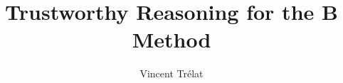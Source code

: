 \documentclass[fontsize=9pt]{scrbook}
\begin{document}
\newcommand{\ThesisTitle}{Trustworthy Reasoning for the B Method}
\newcommand{\ThesisAuthor}{Vincent Tr\'{e}lat}
\newcommand{\ThesisDate}{10 novembre 2026}

\title{\ThesisTitle}
\author{\ThesisAuthor}


\frontmatter

\ifThesisArtCover
  
\fi
\ifThesisOfficialCover
  
\fi
% 
\cleardoublepage

\ifThesisFullBody

  
  
  
  

  \begingroup
  \hypersetup{linkcolor=black}
  \tableofcontents
  \endgroup

  \begingroup
  \hypersetup{linkcolor=black}
  \listoffigures
  \endgroup



  \mainmatter

  

  

  

  

  

  

  

  

  

  

  \backmatter

  
\end{document}

